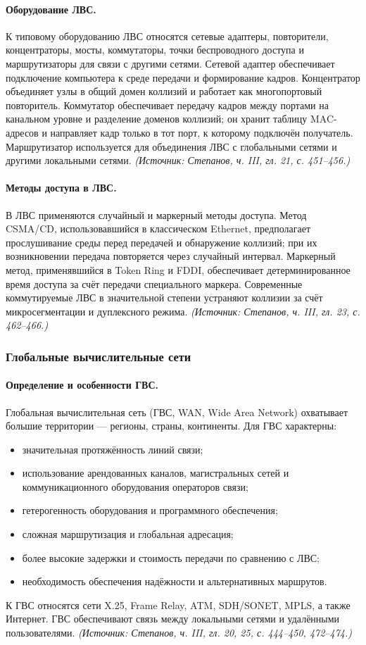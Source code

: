 \documentclass[a4paper,12pt]{article}
\begin{document}
\paragraph{Оборудование ЛВС.}
К типовому оборудованию ЛВС относятся сетевые адаптеры, повторители, концентраторы, мосты, коммутаторы, точки беспроводного доступа и маршрутизаторы для связи с другими сетями. Сетевой адаптер обеспечивает подключение компьютера к среде передачи и формирование кадров. Концентратор объединяет узлы в общий домен коллизий и работает как многопортовый повторитель. Коммутатор обеспечивает передачу кадров между портами на канальном уровне и разделение доменов коллизий; он хранит таблицу MAC-адресов и направляет кадр только в тот порт, к которому подключён получатель. Маршрутизатор используется для объединения ЛВС с глобальными сетями и другими локальными сетями.
\textit{(Источник: Степанов, ч. III, гл. 21, с. 451–456.)}

\paragraph{Методы доступа в ЛВС.}
В ЛВС применяются случайный и маркерный методы доступа. Метод CSMA/CD, использовавшийся в классическом Ethernet, предполагает прослушивание среды перед передачей и обнаружение коллизий; при их возникновении передача повторяется через случайный интервал. Маркерный метод, применявшийся в Token Ring и FDDI, обеспечивает детерминированное время доступа за счёт передачи специального маркера. Современные коммутируемые ЛВС в значительной степени устраняют коллизии за счёт микросегментации и дуплексного режима.
\textit{(Источник: Степанов, ч. III, гл. 23, с. 462–466.)}

\subsubsection{Глобальные вычислительные сети}

\paragraph{Определение и особенности ГВС.}
Глобальная вычислительная сеть (ГВС, WAN, Wide Area Network) охватывает большие территории — регионы, страны, континенты. Для ГВС характерны:
\begin{itemize}
\item значительная протяжённость линий связи;
\item использование арендованных каналов, магистральных сетей и коммуникационного оборудования операторов связи;
\item гетерогенность оборудования и программного обеспечения;
\item сложная маршрутизация и глобальная адресация;
\item более высокие задержки и стоимость передачи по сравнению с ЛВС;
\item необходимость обеспечения надёжности и альтернативных маршрутов.
\end{itemize}
К ГВС относятся сети X.25, Frame Relay, ATM, SDH/SONET, MPLS, а также Интернет. ГВС обеспечивают связь между локальными сетями и удалёнными пользователями.
\textit{(Источник: Степанов, ч. III, гл. 20, 25, с. 444–450, 472–474.)}
\end{document}
